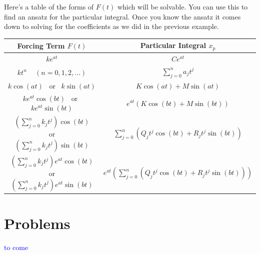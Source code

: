         
        \noindent Here's a table of the forms of $F(t)$ which will be solvable. You can use this to find an ansatz for the particular integral.  Once you know the ansatz it comes down to solving for the coefficients as we did in the previous example.
        \begin{table}[H]
        \centering
        \renewcommand{\arraystretch}{1.75}
            \begin{tabular}{c|c}
                Forcing Term $F(t)$&  Particular Integral $x_p$\\
                \hline
                $ke^{at}$ & $Ce^{at}$\\
                \hline
                $kt^n$ ~ $(n=0,1,2,\dots)$ & $\sum_{j=0}^n a_j t^j$\\
                \hline
                $k\cos(at)$ ~\textrm{or}~ $k\sin(at)$ & $K\cos(at)+M\sin(at)$\\
                \hline
                $ke^{at}\cos(bt)$ ~\textrm{or}~ $ke^{at}\sin(bt)$ & $e^{at}(K\cos(bt)+M\sin(bt))$\\
                \hline
                $\displaystyle{\left(\sum_{j=0}^n k_jt^j\right) \cos(bt)}$ ~\textrm{or}~ $\displaystyle{\left(\sum_{j=0}^n k_jt^j\right) \sin(bt)}$ & $\displaystyle{\sum_{j=0}^n\left( Q_jt^j \cos(bt) + R_jt^j \sin(bt)\right)}$\\
                \hline
                $\displaystyle{\left(\sum_{j=0}^n k_jt^j\right) e^{at}\cos(bt)}$ ~\textrm{or}~ $\displaystyle{\left(\sum_{j=0}^n k_jt^j\right) e^{at}\sin(bt)}$ & $\displaystyle{e^{at}\left(\sum_{j=0}^n \left( Q_jt^j \cos(bt) + R_jt^j \sin(bt)\right)\right)}$
            \end{tabular}
    \end{table}


        
        \newpage
        \section{Problems}
        \textcolor{blue}{to come}
        

        
